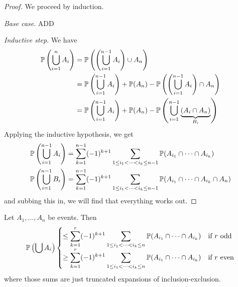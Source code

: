 \documentclass{../template/note}
\begin{document}
    \begin{proof}
        We proceed by induction.

        \emph{Base case}. ADD

        \emph{Inductive step}. We have
        \begin{align*}
            \mathbb P\left(\bigcup_{i=1}^n A_i\right) &= \mathbb P\left(\left(\bigcup_{i=1}^{n-1} A_i\right) \cup A_n\right) \\
            &= \mathbb P\left(\bigcup_{i=1}^{n-1} A_i\right) + \mathbb P(A_n) - \mathbb P\left(\left(\bigcup_{i=1}^{n-1} A_i\right) \cap A_n\right) \\
            &= \mathbb P\left(\bigcup_{i=1}^{n-1} A_i\right) + \mathbb P(A_n) - \mathbb P\left(\bigcup_{i=1}^{n-1} \underbrace{\left(A_i \cap A_n\right)}_{B_i}\right)
        \end{align*}
        Applying the inductive hypothesis, we get
        \begin{align*}
            \mathbb P\left(\bigcup_{i=1}^{n-1} A_i\right) &= \sum_{k=1}^{n-1} (-1)^{k+1} \sum_{1 \leq i_1 < \dots < i_k \leq n-1} \mathbb P(A_{i_1} \cap \dots \cap A_{i_k}) \\
            \mathbb P\left(\bigcup_{i=1}^{n-1} B_i\right) &= \sum_{k=1}^{n-1} (-1)^{k+1} \sum_{1 \leq i_1 < \dots < i_k \leq n-1} \mathbb P(A_{i_1} \cap \dots \cap A_{i_k} \cap A_n)
        \end{align*}
        and subbing this in, we will find that everything works out.
    \end{proof}
    
    \begin{proposition}
        Let \(A_1, \dots, A_n\) be events. Then
        \begin{align*}
            \mathbb P\left(\bigcup A_i\right) \begin{cases}
                \displaystyle \leq \sum_{k=1}^r (-1)^{k+1} \sum_{1 \leq i_1 < \dots < i_k \leq n} \mathbb P(A_{i_1} \cap \cdots \cap A_{i_k}) & \text{if } r \text{ odd} \\
                \displaystyle \geq \sum_{k=1}^r (-1)^{k+1} \sum_{1 \leq i_1 < \dots < i_k \leq n} \mathbb P(A_{i_1} \cap \cdots \cap A_{i_k}) & \text{if } r \text{ even} 
            \end{cases}
        \end{align*}
        where those sums are just truncated expansions of inclusion-exclusion.
    \end{proposition}
    
\end{document}
